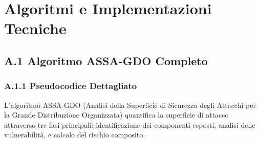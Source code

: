 
\appendix


\chapter{Algoritmi e Implementazioni Tecniche}
\label{app:algoritmi}

\section{A.1 Algoritmo ASSA-GDO Completo}
\label{sec:assa-gdo-code}

\subsection{A.1.1 Pseudocodice Dettagliato}

L'algoritmo ASSA-GDO (Analisi della Superficie di Sicurezza degli Attacchi per la Grande Distribuzione Organizzata) quantifica la superficie di attacco attraverso tre fasi principali: identificazione dei componenti esposti, analisi delle vulnerabilità, e calcolo del rischio composito.

